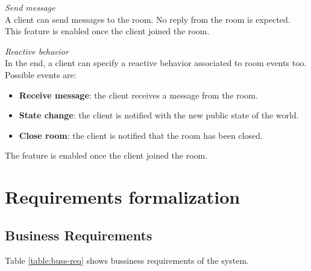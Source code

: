 \bigskip
\textit{Send message}
\\
A client can send messages to the room. No reply from the room is expected.
This feature is enabled once the client joined the room.

\bigskip
\textit{Reactive behavior}
\\
In the end, a client can specify a reactive behavior associated to room events too. Possible events are:
\begin{itemize}
\item \textbf{Receive message}: the client receives a message from the room.
\item \textbf{State change}: the client is notified with the new public state of the world.
\item \textbf{Close room}: the client is notified that the room has been closed.
\end{itemize} 
The feature is enabled once the client joined the room. 

\section{Requirements formalization}

\subsection{Business Requirements}

Table \ref{table:buss-req} shows bussiness requirements of the system.

